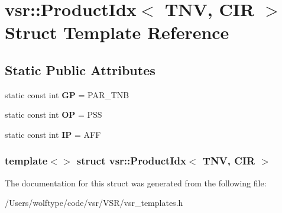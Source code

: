\hypertarget{structvsr_1_1_product_idx_3_01_t_n_v_00_01_c_i_r_01_4}{\section{vsr\-:\-:Product\-Idx$<$ T\-N\-V, C\-I\-R $>$ Struct Template Reference}
\label{structvsr_1_1_product_idx_3_01_t_n_v_00_01_c_i_r_01_4}
}
\subsection*{Static Public Attributes}
\begin{DoxyCompactItemize}
\item 
\hypertarget{structvsr_1_1_product_idx_3_01_t_n_v_00_01_c_i_r_01_4_a615ab3406945e4dd908d96c9b3919b63}{static const int {\bfseries G\-P} = P\-A\-R\-\_\-\-T\-N\-B}\label{structvsr_1_1_product_idx_3_01_t_n_v_00_01_c_i_r_01_4_a615ab3406945e4dd908d96c9b3919b63}

\item 
\hypertarget{structvsr_1_1_product_idx_3_01_t_n_v_00_01_c_i_r_01_4_ab83351cc692f4d654695c7c939660a0f}{static const int {\bfseries O\-P} = P\-S\-S}\label{structvsr_1_1_product_idx_3_01_t_n_v_00_01_c_i_r_01_4_ab83351cc692f4d654695c7c939660a0f}

\item 
\hypertarget{structvsr_1_1_product_idx_3_01_t_n_v_00_01_c_i_r_01_4_a680e31ccc855867d02b4dafca7db6f24}{static const int {\bfseries I\-P} = A\-F\-F}\label{structvsr_1_1_product_idx_3_01_t_n_v_00_01_c_i_r_01_4_a680e31ccc855867d02b4dafca7db6f24}

\end{DoxyCompactItemize}
\subsubsection*{template$<$$>$ struct vsr\-::\-Product\-Idx$<$ T\-N\-V, C\-I\-R $>$}



The documentation for this struct was generated from the following file\-:\begin{DoxyCompactItemize}
\item 
/\-Users/wolftype/code/vsr/\-V\-S\-R/vsr\-\_\-templates.\-h\end{DoxyCompactItemize}
